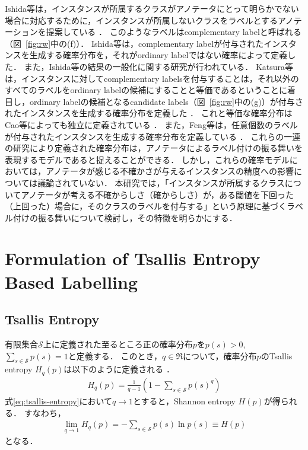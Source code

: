 \documentclass[a4paper,conference]{IEEEtran}
\begin{document}
Ishida等は，インスタンスが所属するクラスがアノテータにとって明らかでない場合に対応するために，インスタンスが所属しないクラスをラベルとするアノテーションを提案している \cite{Ishida:2017}．
このようなラベルはcomplementary labelと呼ばれる（図~\ref{fig:rw}中の(f)）．
Ishida等は，complementary labelが付与されたインスタンスを生成する確率分布を，それがordinary labelではない確率によって定義した．
また，Ishida等の結果の一般化に関する研究が行われている．
Katsura等は，インスタンスに対してcomplementary labelsを付与することは，それ以外のすべてのラベルをordinary labelの候補にすることと等価であるということに着目し，ordinary labelの候補となるcandidate labels（図~\ref{fig:rw}中の(g)）が付与されたインスタンスを生成する確率分布を定義した \cite{Katsura:2020}．
これと等価な確率分布はCao等によっても独立に定義されている \cite{Cao:2020}．
また，Feng等は，任意個数のラベルが付与されたインスタンスを生成する確率分布を定義している \cite{Feng:2019}．
これらの一連の研究により定義された確率分布は，アノテータによるラベル付けの振る舞いを表現するモデルであると捉えることができる．
しかし，これらの確率モデルにおいては，アノテータが感じる不確かさが与えるインスタンスの精度への影響については議論されていない．
本研究では，「インスタンスが所属するクラスについてアノテータが考える不確からしさ（確からしさ）が，ある閾値を下回った（上回った）場合に，そのクラスのラベルを付与する」という原理に基づくラベル付けの振る舞いについて検討し，その特徴を明らかにする．

\section{Formulation of Tsallis Entropy Based Labelling}
\subsection{Tsallis Entropy}
有限集合$\mathcal{S}$上に定義された至るところ正の確率分布$p$を$p(s) > 0$, $\sum_{s\in\mathcal{S}}p(s)=1$と定義する．
このとき，$q \in \mathfrak{R}$について，確率分布$p$のTsallis entropy $H_{q}(p)$は以下のように定義される \cite{Tsallis:1988}．
\begin{align}
    H_{q}(p) = \frac{1}{q-1}\left(1-\sum_{s \in \mathcal{S}}p(s)^{q}\right)\label{eq:tsallis-entropy}
\end{align}
式\eqref{eq:tsallis-entropy}において$q \rightarrow 1$とすると，Shannon entropy $H(p)$が得られる．
すなわち，
\begin{align}
    \lim_{q \rightarrow 1}H_{q}(p) = - \sum_{s \in \mathcal{S}} p(s) \ln p(s) \equiv H(p)\label{eq:shannon-entropy}
\end{align}
となる．
\end{document}
